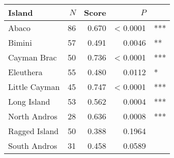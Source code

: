 
\begin{tabular}{lrrrl}
\toprule
Island & $N$ & Score & $P$ & \\
\midrule
Abaco & 86 & 0.670 & < 0.0001 & ***\\
Bimini & 57 & 0.491 & 0.0046 & **\\
Cayman Brac & 50 & 0.736 & < 0.0001 & ***\\
Eleuthera & 55 & 0.480 & 0.0112 & *\\
Little Cayman & 45 & 0.747 & < 0.0001 & ***\\
Long Island & 53 & 0.562 & 0.0004 & ***\\
North Andros & 28 & 0.636 & 0.0008 & ***\\
Ragged Island & 50 & 0.388 & 0.1964 & \\
South Andros & 31 & 0.458 & 0.0589 & \\
\bottomrule
\end{tabular}